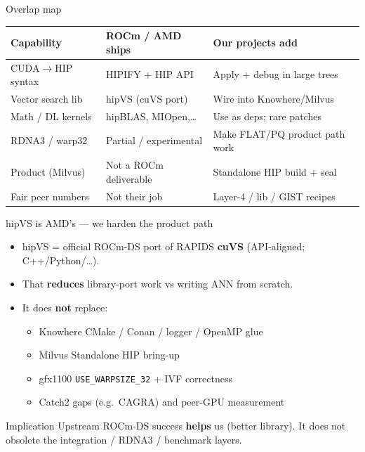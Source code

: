 \documentclass[aspectratio=169,11pt]{beamer}
\begin{document}
\begin{frame}{Overlap map}
  \footnotesize
  \begin{center}
  \begin{tabular}{@{}p{3.2cm}p{4.0cm}p{4.0cm}@{}}
    \toprule
    \textbf{Capability} & \textbf{ROCm / AMD ships} & \textbf{Our projects add} \\
    \midrule
    CUDA$\rightarrow$HIP syntax & HIPIFY + HIP API & Apply + debug in large trees \\
    Vector search lib & hipVS (cuVS port) & Wire into Knowhere/Milvus \\
    Math / DL kernels & hipBLAS, MIOpen,\ldots & Use as deps; rare patches \\
    RDNA3 / warp32 & Partial / experimental & Make FLAT/PQ product path work \\
    Product (Milvus) & Not a ROCm deliverable & Standalone HIP build + seal \\
    Fair peer numbers & Not their job & Layer-4 / lib / GIST recipes \\
    \bottomrule
  \end{tabular}
  \end{center}
\end{frame}

\begin{frame}{hipVS is AMD's --- we harden the product path}
  \begin{itemize}
    \item hipVS = official ROCm-DS port of RAPIDS \textbf{cuVS}
          (API-aligned; C++/Python/\ldots).
    \item That \textbf{reduces} library-port work vs writing ANN from scratch.
    \item It does \textbf{not} replace:
          \begin{itemize}
            \item Knowhere CMake / Conan / logger / OpenMP glue
            \item Milvus Standalone HIP bring-up
            \item gfx1100 \texttt{USE\_WARPSIZE\_32} + IVF correctness
            \item Catch2 gaps (e.g.\ CAGRA) and peer-GPU measurement
          \end{itemize}
  \end{itemize}

  \vspace{0.4em}
  \begin{block}{Implication}
    \footnotesize
    Upstream ROCm-DS success \textbf{helps} us (better library).
    It does not obsolete the integration / RDNA3 / benchmark layers.
  \end{block}
\end{frame}
\end{document}
